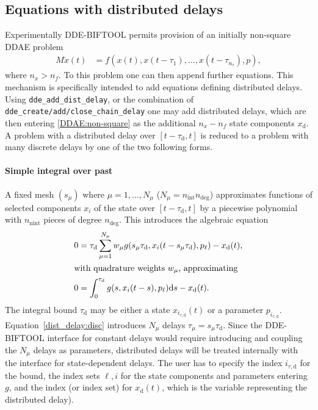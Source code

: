 \documentclass[10pt]{scrartcl}
\newcommand{\DDEBIFCODE}{\textsc{DDE-BIFTOOL}}
\renewcommand{\d}{\mathrm{d}}
\newcommand{\blist}[1]{\mbox{\lstinline!#1!}}
\begin{document}
\subsection{Equations with distributed delays}
\label{sec:distdelay}
Experimentally \DDEBIFCODE{} permits provision of an initially
non-square DDAE problem
\begin{align}
  \label{DDAE:non-square}
  M \dot x(t)&=f(x(t),x(t-\tau_1),\ldots,x(t-\tau_{n_\tau}),p),
\end{align}
where $n_x>n_f$. To this problem one can then append further
equations. This mechanism is specifically intended to add equations
defining distributed delays. Using \blist{dde_add_dist_delay}, or the
combination of \blist{dde_create/add/close_chain_delay} one may add
distributed delays, which are then entering \eqref{DDAE:non-square} as
the additional $n_x-n_f$ state components $x_\mathrm{d}$. A problem
with a distributed delay over $[t-\tau_\mathrm{d},t]$ is reduced to a
problem with many discrete delays by
one of the two following
forms.

\paragraph{Simple integral over past}
A fixed mesh $(s_\mu)$ where $\mu=1,\ldots,N_\mu$
($N_\mu=n_\mathrm{int}n_\mathrm{deg}$) approximates functions of selected
components $x_i$ of the state over $[t-\tau_\mathrm{d},t]$ by a
piecewise polynomial with $n_\mathrm{nint}$ pieces of degree
$n_\mathrm{deg}$. This introduces the algebraic equation
\begin{align}
  \label{dist_delay:disc}
  0&=\tau_\mathrm{d}\sum_{\mu=1}^{N_\mu}w_\mu g(s_\mu\tau_\mathrm{d},x_i(t-s_\mu\tau_\mathrm{d}),p_\ell)-x_\mathrm{d}(t),\\
  \intertext{with quadrature weights $w_\mu$, approximating}
    0&=\int_0^{\tau_\mathrm{d}} g(s,x_i(t-s),p_\ell)\d s-x_\mathrm{d}(t).\label{dist_delay:simple}
\end{align}
The integral bound $\tau_\mathrm{d}$ may be either a state
$x_{i_{\tau,\mathrm{d}}}(t)$ or a parameter
$p_{i_{\tau,\mathrm{d}}}$. Equation~\eqref{dist_delay:disc} introduces
$N_\mu$ delays $\tau_\mu=s_\mu\tau_\mathrm{d}$. Since the
{\DDEBIFCODE} interface for constant delays would require introducing
and coupling the $N_\mu$ delays as parameters, distributed delays will
be treated internally with the interface for state-dependent
delays. The user has to specify the index $i_{\tau,\mathrm{d}}$ for the bound, the
index sets $\ell,i$ for the state components and parameters entering $g$, and the index (or index set) for
$x_\mathrm{d}(t)$, which is the variable representing the distributed
delay).
\end{document}
